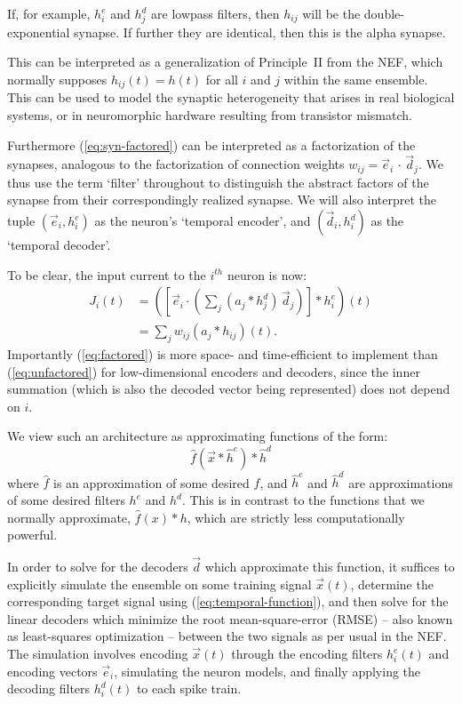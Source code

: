 If, for example, $h^e_i$ and $h^d_j$ are lowpass filters, then $h_{ij}$ will be the double-exponential synapse. If further  they are identical, then this is the alpha synapse.

This can be interpreted as a generalization of Principle~II from the NEF, which normally supposes $h_{ij}(t) = h(t)$ for all $i$ and $j$ within the same ensemble.
This can be used to model the synaptic heterogeneity that arises in real biological systems, or in neuromorphic hardware resulting from transistor mismatch. 

Furthermore (\ref{eq:syn-factored}) can be interpreted as a factorization of the synapses, analogous to the factorization of connection weights \mbox{$w_{ij} = \vec{e}_i \, \cdot \, \vec{d}_j$}.
We thus use the term `filter' throughout to distinguish the abstract factors of the synapse from their correspondingly realized synapse.
We will also interpret the tuple $(\vec{e}_i, h^e_i)$ as the neuron's `temporal encoder', and $(\vec{d}_i, h^d_i)$ as the `temporal decoder'.

To be clear, the input current to the $i^{th}$ neuron is now:
\begin{align}
J_i(t) &= \left( \left[ \vec{e}_i \cdot \left( \sum_j ( a_j \ast h^d_j) \, \vec{d}_j \right) \right] \ast h^e_i \right)(t) \label{eq:factored} \\
       &= \sum_j w_{ij} (a_j \ast h_{ij})(t) . \label{eq:unfactored}
\end{align}
Importantly (\ref{eq:factored}) is more space- and time-efficient to implement than (\ref{eq:unfactored}) for low-dimensional encoders and decoders, since the inner summation (which is also the decoded vector being represented) does not depend on $i$.

We view such an architecture as approximating functions of the form:
\begin{equation} \label{eq:temporal-function}
\hat{f}(\vec{x} \ast \hat{h}^e) \ast \hat{h}^d
\end{equation}
where $\hat{f}$ is an approximation of some desired $f$, and $\hat{h}^e$ and $\hat{h}^d$ are approximations of some desired filters $h^e$ and $h^d$.
This is in contrast to the functions that we normally approximate, $\hat{f}(x) \ast h$, which are strictly less computationally powerful.

In order to solve for the decoders $\vec{d}$ which approximate this function, it suffices to explicitly simulate the ensemble on some training signal $\vec{x}(t)$, determine the corresponding target signal using (\ref{eq:temporal-function}), and then solve for the linear decoders which minimize the root mean-square-error (RMSE) -- also known as least-squares optimization -- between the two signals as per usual in the NEF.
The simulation involves encoding $\vec{x}(t)$ through the encoding filters $h_i^e(t)$ and encoding vectors $\vec{e}_i$, simulating the neuron models, and finally applying the decoding filters $h_i^d(t)$ to each spike train.

